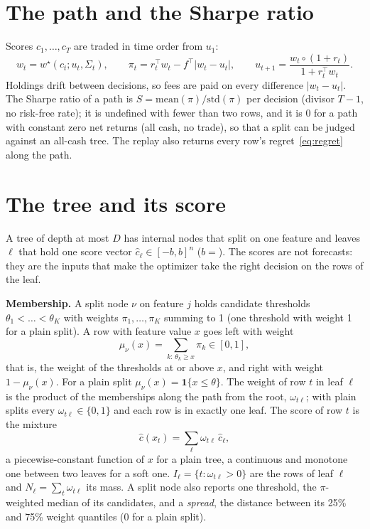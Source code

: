 \documentclass[11pt,a4paper]{article}
\newcommand{\code}[1]{\texttt{\detokenize{#1}}}
\newcommand{\1}{\mathbf{1}}
\begin{document}
\section{The path and the Sharpe ratio}\label{sec:path}
Scores $c_1,\dots,c_T$ are traded in time order from $u_1$:
\begin{equation}\label{eq:path}
w_t=w^\star(c_t;u_t,\Sigma_t),\qquad \pi_t=r_t^\top w_t-f^\top|w_t-u_t|,\qquad u_{t+1}=\frac{w_t\circ(1+r_t)}{1+r_t^\top w_t}.
\end{equation}
Holdings drift between decisions, so fees are paid on every difference $|w_t-u_t|$. The Sharpe ratio of a path is $S=\mathrm{mean}(\pi)/\mathrm{std}(\pi)$ per decision (divisor $T-1$, no risk-free rate); it is undefined with fewer than two rows, and it is $0$ for a path with constant zero net returns (all cash, no trade), so that a split can be judged against an all-cash tree. The replay also returns every row's regret~\eqref{eq:regret} along the path.

\section{The tree and its score}\label{sec:tree}
A tree of depth at most $D$ has internal nodes that split on one feature and leaves $\ell$ that hold one score vector $\hat c_\ell\in[-b,b]^n$ ($b={}$\code{prediction_bound}). The scores are not forecasts: they are the inputs that make the optimizer take the right decision on the rows of the leaf.

\textbf{Membership.} A split node $\nu$ on feature $j$ holds candidate thresholds $\theta_1<\dots<\theta_K$ with weights $\pi_1,\dots,\pi_K$ summing to 1 (one threshold with weight 1 for a plain split). A row with feature value $x$ goes left with weight
\begin{equation}\label{eq:membership}
\mu_\nu(x)=\sum_{k:\,\theta_k\ge x}\pi_k\in[0,1],
\end{equation}
that is, the weight of the thresholds at or above $x$, and right with weight $1-\mu_\nu(x)$. For a plain split $\mu_\nu(x)=\1\{x\le\theta\}$. The weight of row $t$ in leaf $\ell$ is the product of the memberships along the path from the root, $\omega_{t\ell}$; with plain splits every $\omega_{t\ell}\in\{0,1\}$ and each row is in exactly one leaf. The score of row $t$ is the mixture
\begin{equation}\label{eq:score}
\hat c(x_t)=\sum_\ell\omega_{t\ell}\,\hat c_\ell ,
\end{equation}
a piecewise-constant function of $x$ for a plain tree, a continuous and monotone one between two leaves for a soft one. $I_\ell=\{t:\omega_{t\ell}>0\}$ are the rows of leaf $\ell$ and $N_\ell=\sum_t\omega_{t\ell}$ its mass. A split node also reports one threshold, the $\pi$-weighted median of its candidates, and a \emph{spread}, the distance between its 25\% and 75\% weight quantiles ($0$ for a plain split).
\end{document}

